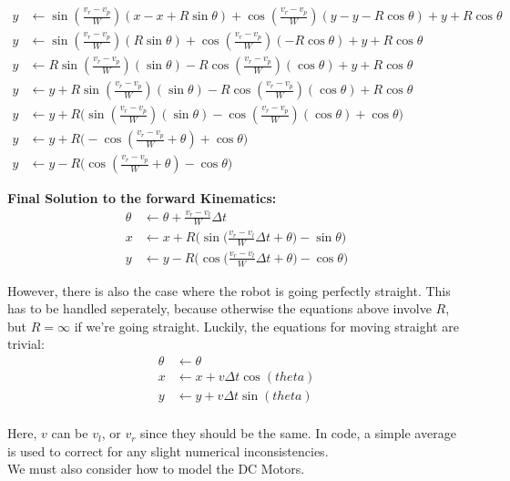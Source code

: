 \documentclass{article}
\begin{document}
\begin{align}
  y &\leftarrow \sin{(\frac{v_r-v_p}{W})}(x-x+R\sin{\theta})+\cos{(\frac{v_r-v_p}{W})}(y-y-R\cos{\theta}) + y+R\cos{\theta} \\
  y &\leftarrow \sin{(\frac{v_r-v_p}{W})}(R\sin{\theta})+\cos{(\frac{v_r-v_p}{W})}(-R\cos{\theta}) + y+R\cos{\theta} \\
  y &\leftarrow R\sin{(\frac{v_r-v_p}{W})}(\sin{\theta})-R\cos{(\frac{v_r-v_p}{W})}(\cos{\theta}) + y+R\cos{\theta} \\
  y &\leftarrow y + R\sin{(\frac{v_r-v_p}{W})}(\sin{\theta})-R\cos{(\frac{v_r-v_p}{W})}(\cos{\theta}) + R\cos{\theta} \\
  y &\leftarrow y + R\Bigg(\sin{(\frac{v_r-v_p}{W})}(\sin{\theta})-\cos{(\frac{v_r-v_p}{W})}(\cos{\theta}) + \cos{\theta}\Bigg) \\
  y &\leftarrow y + R\Bigg(-\cos{(\frac{v_r-v_p}{W} + \theta)} + \cos{\theta}\Bigg) \\
  y &\leftarrow y - R\Bigg(\cos{(\frac{v_r-v_p}{W} + \theta)} - \cos{\theta}\Bigg)
\end{align}

\textbf{Final Solution to the forward Kinematics:}
\begin{align}
 \theta &\leftarrow \theta + \frac{v_r-v_l}{W}\Delta t \\
  x &\leftarrow x+R\Bigg(\sin{\Big(\frac{v_r-v_l}{W}\Delta t+\theta\Big)}-\sin{\theta}\Bigg) \\
  y &\leftarrow y-R\Bigg(\cos{\Big(\frac{v_r-v_l}{W}\Delta t+\theta\Big)}-\cos{\theta}\Bigg)
\end{align}

However, there is also the case where the robot is going perfectly straight. This has to be handled seperately, because otherwise the equations above involve $R$, but $R=\infty$ if we're going straight. Luckily, the equations for moving straight are trivial:
\begin{align}
 \theta &\leftarrow \theta \\
  x &\leftarrow x + v\Delta t\cos(theta) \\
  y &\leftarrow y + v\Delta t\sin(theta) \\
\end{align}

Here, $v$ can be $v_l$, or $v_r$ since they should be the same. In code, a simple average is used to correct for any slight numerical inconsistencies. \\

We must also consider how to model the DC Motors. \\
\end{document}
